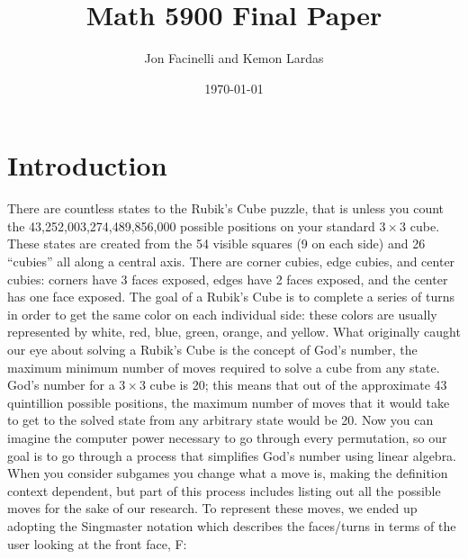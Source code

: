 \documentclass{article}
\title{Math 5900 Final Paper}
\author{Jon Facinelli and Kemon Lardas}
\date{\today}
\begin{document}
\maketitle

\section{Introduction}
There are countless states to the Rubik’s Cube puzzle, that is unless you count the 43,252,003,274,489,856,000 possible positions on your standard $3\times 3$ cube.  These states are created from the 54 visible squares (9 on each side) and 26 “cubies” all along a central axis.  There are corner cubies, edge cubies, and center cubies: corners have 3 faces exposed, edges have 2 faces exposed, and the center has one face exposed.  The goal of a Rubik’s Cube is to complete a series of turns in order to get the same color on each individual side: these colors are usually represented by white, red, blue, green, orange, and yellow.  What originally caught our eye about solving a Rubik’s Cube is the concept of God’s number, the maximum minimum number of moves required to solve a cube from any state.  God’s number for a $3 \times 3$ cube is 20; this means that out of the approximate 43 quintillion possible positions, the maximum number of moves that it would take to get to the solved state from any arbitrary state would be 20.  Now you can imagine the computer power necessary to go through every permutation, so our goal is to go through a process that simplifies God’s number using linear algebra. When you consider subgames you change what a move is, making the definition context dependent, but part of this process includes listing out all the possible moves for the sake of our research.  To represent these moves, we ended up adopting the Singmaster notation which describes the faces/turns in terms of the user looking at the front face, F:
\end{document}
